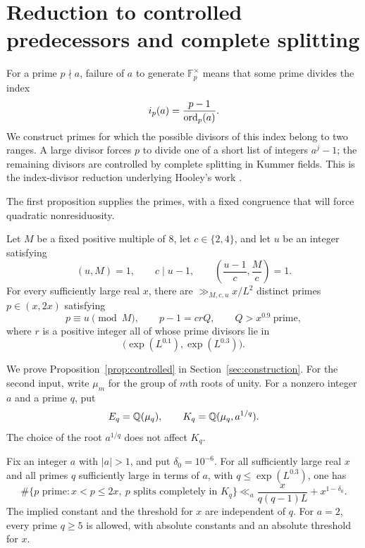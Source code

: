 \section{Reduction to controlled predecessors and complete splitting}
\label{sec:reduction}

For a prime $p\nmid a$, failure of $a$ to generate $\mathbb F_p^\times$
means that some prime divides the index
\[
 i_p(a)=\frac{p-1}{\operatorname{ord}_p(a)}.
\]
We construct primes for which the possible divisors of this index belong
to two ranges. A large divisor forces $p$ to divide one of a short list
of integers $a^j-1$; the remaining divisors are controlled by complete
splitting in Kummer fields. This is the index-divisor reduction underlying
Hooley's work \cite[Sections~4--7]{Hooley67}.

The first proposition supplies the primes, with a fixed congruence that
will force quadratic nonresiduosity.

\begin{proposition}
\label{prop:controlled}\label{prop:prime-reservoir}
Let $M$ be a fixed positive multiple of $8$, let $c\in\{2,4\}$, and let
$u$ be an integer satisfying
\begin{equation}
 (u,M)=1,\qquad c\mid u-1,\qquad
 \left(\frac{u-1}{c},\frac Mc\right)=1.
 \label{alg:progression-conditions}
\end{equation}
For every sufficiently large real $x$, there are
$\gg_{M,c,u}x/L^2$ distinct primes $p\in(x,2x)$ satisfying
\begin{equation}
 p\equiv u\pmod M,\qquad p-1=crQ,
 \qquad Q>x^{0.9}\ \text{prime},
 \label{eq:controlled-predecessor}
\end{equation}
where $r$ is a positive integer all of whose prime divisors lie in
\[
 \bigl(\exp(L^{0.1}),\exp(L^{0.3})\bigr).
\]
\end{proposition}

We prove Proposition~\ref{prop:controlled} in
Section~\ref{sec:construction}. For the second input, write $\mu_m$ for
the group of $m$th roots of unity. For a nonzero integer $a$ and a prime
$q$, put
\begin{equation}
 E_q=\mathbb{Q}(\mu_q),\qquad K_q=\mathbb{Q}(\mu_q,a^{1/q}).
 \label{alg:kummer-fields}
\end{equation}
The choice of the root $a^{1/q}$ does not affect $K_q$.

\begin{proposition}
\label{prop:splitting}
Fix an integer $a$ with $|a|>1$, and put $\delta_0=10^{-6}$.
For all sufficiently large real $x$ and all primes $q$ sufficiently
large in terms of $a$, with $q\le\exp(L^{0.3})$, one has
\begin{equation}
 \#\{p\text{ prime}:x<p\le2x,\ p\text{ splits completely in }K_q\}
 \ll_a \frac{x}{q(q-1)L}+x^{1-\delta_0}.
 \label{eq:uniform-splitting}
\end{equation}
The implied constant and the threshold for $x$ are independent of $q$.
For $a=2$, every prime $q\ge5$ is allowed, with absolute constants and
an absolute threshold for $x$.
\end{proposition}

